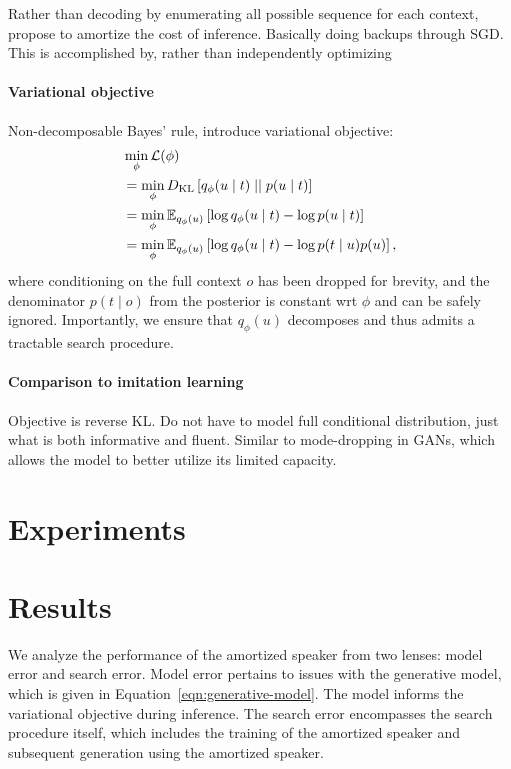 \documentclass[11pt,a4paper]{article}
\newcommand\qphi{q_\phi}
\begin{document}
Rather than decoding by enumerating all possible sequence for each context,
\citet{white2020learning} propose to amortize the cost of inference.
Basically doing backups through SGD.
This is accomplished by, rather than independently optimizing

\paragraph{Variational objective}
Non-decomposable Bayes' rule, introduce variational objective:
\begin{equation}
\begin{aligned}
&\min_\phi \mcL(\phi) \\
&=\min_\phi \KL{\qphi(u\mid t) \;||\; p(u\mid t)}\\
&= \min_\phi \Es{\qphi(u)}{\log \qphi(u\mid t) - \log p(u\mid t)}\\
&= \min_\phi \Es{\qphi(u)}{\log \qphi(u\mid t) - \log p(t \mid u)p(u)},
\end{aligned}
\end{equation}
where conditioning on the full context $o$ has been dropped for brevity,
and the denominator $p(t\mid o)$ from the posterior is constant wrt $\phi$
and can be safely ignored.
Importantly, we ensure that $\qphi(u)$ decomposes and thus admits a tractable search procedure.


\paragraph{Comparison to imitation learning}
Objective is reverse KL.
Do not have to model full conditional distribution, 
just what is both informative and fluent.
Similar to mode-dropping in GANs, which allows the model to better
utilize its limited capacity.

\section{Experiments}


\section{Results}
We analyze the performance of the amortized speaker from two lenses:
model error and search error.
Model error pertains to issues with the generative model,
which is given in Equation~\ref{eqn:generative-model}.
The model informs the variational objective during inference.
The search error encompasses the search procedure itself,
which includes the training of the amortized speaker and subsequent
generation using the amortized speaker.
\end{document}
